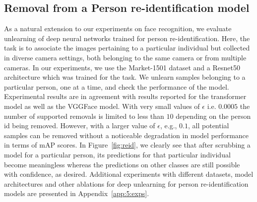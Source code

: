\subsection{Removal from a Person re-identification model}
As a natural extension to our experiments on face recognition, we evaluate unlearning of deep neural networks trained for person re-identification. Here, the task is to associate the images pertaining to a particular individual but collected in diverse camera settings, both belonging to the same camera or from multiple cameras. In our experiments, we use the Market-1501 dataset \citep{zheng2015scalable} and a Resnet50 architecture which was trained for the task. We unlearn samples belonging to a particular person, one at a time, and check the performance of the model. Experimental results are in agreement with results reported for the transformer model as well as the VGGFace model. With very small values of $\epsilon$ i.e. $0.0005$ the number of supported removals is limited to less than $10$ depending on the person id being removed. However, with a larger value of $\epsilon$, e.g., $0.1$, all potential samples can be removed without a noticeable degradation in model performance in terms of mAP scores. In Figure~\ref{fig:reid}, we clearly see that after scrubbing a model for a particular person, its predictions for that particular individual become meaningless whereas the predictions on other classes are still possible with confidence, as desired. Additional experiments with different datasets, model architectures and other ablations for deep unlearning for person re-identification models are presented in Appendix~\ref{app:5:exps}.

